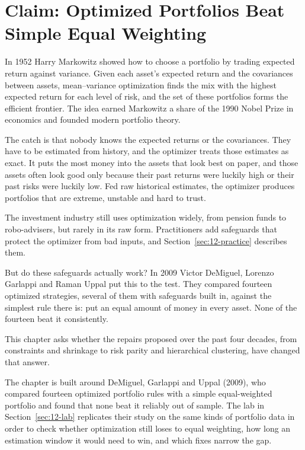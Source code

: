 \chapter{Claim: Optimized Portfolios Beat Simple Equal Weighting}
\label{ch:12}

In 1952 Harry Markowitz showed how to choose a portfolio by trading expected return against variance. Given each asset's expected return and the covariances between assets, mean--variance optimization finds the mix with the highest expected return for each level of risk, and the set of these portfolios forms the efficient frontier. The idea earned Markowitz a share of the 1990 Nobel Prize in economics and founded modern portfolio theory.

The catch is that nobody knows the expected returns or the covariances. They have to be estimated from history, and the optimizer treats those estimates as exact. It puts the most money into the assets that look best on paper, and those assets often look good only because their past returns were luckily high or their past risks were luckily low. Fed raw historical estimates, the optimizer produces portfolios that are extreme, unstable and hard to trust.

The investment industry still uses optimization widely, from pension funds to robo-advisers, but rarely in its raw form. Practitioners add safeguards that protect the optimizer from bad inputs, and Section~\ref{sec:12-practice} describes them.

But do these safeguards actually work? In 2009 Victor DeMiguel, Lorenzo Garlappi and Raman Uppal put this to the test. They compared fourteen optimized strategies, several of them with safeguards built in, against the simplest rule there is: put an equal amount of money in every asset.
None of the fourteen beat it consistently.

This chapter asks whether the repairs proposed over the past four decades, from constraints and shrinkage to risk parity and hierarchical clustering, have changed that answer.




The chapter is built around DeMiguel, Garlappi and Uppal (2009), who compared fourteen optimized portfolio rules with a simple equal-weighted portfolio and found that none beat it reliably out of sample. The lab in Section~\ref{sec:12-lab} replicates their study on the same kinds of portfolio data in order to check whether optimization still loses to equal weighting, how long an estimation window it would need to win, and which fixes narrow the gap.

